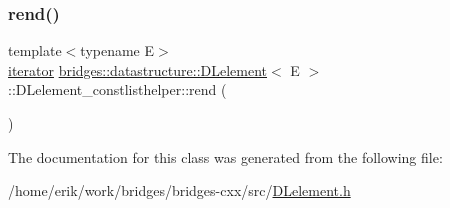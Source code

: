 \mbox{\label{classbridges_1_1datastructure_1_1_d_lelement_1_1_d_lelement__constlisthelper_a1085a069b94d7d78f81de9764e4db6b4}} 
\subsubsection{\texorpdfstring{rend()}{rend()}}
{\footnotesize\ttfamily template$<$typename E$>$ \\
\hyperlink{classbridges_1_1datastructure_1_1_d_lelement_1_1_d_lelement__constlisthelper_1_1iterator}{iterator} \hyperlink{classbridges_1_1datastructure_1_1_d_lelement}{bridges\+::datastructure\+::\+D\+Lelement}$<$ E $>$\+::D\+Lelement\+\_\+constlisthelper\+::rend (\begin{DoxyParamCaption}{ }\end{DoxyParamCaption})\hspace{0.3cm}{\ttfamily [inline]}}



The documentation for this class was generated from the following file\+:\begin{DoxyCompactItemize}
\item 
/home/erik/work/bridges/bridges-\/cxx/src/\hyperlink{_d_lelement_8h}{D\+Lelement.\+h}\end{DoxyCompactItemize}
